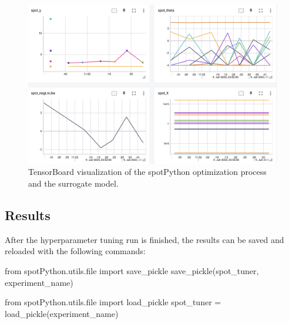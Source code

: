 \documentclass[
  letterpaper,
  DIV=11,
  numbers=noendperiod]{scrreprt}
\newenvironment{Shaded}{\begin{snugshade}}{\end{snugshade}}
\newcommand{\BuiltInTok}[1]{\textcolor[rgb]{0.00,0.23,0.31}{#1}}
\newcommand{\ImportTok}[1]{\textcolor[rgb]{0.00,0.46,0.62}{#1}}
\newcommand{\NormalTok}[1]{\textcolor[rgb]{0.00,0.23,0.31}{#1}}
\newcommand{\OperatorTok}[1]{\textcolor[rgb]{0.37,0.37,0.37}{#1}}
\begin{document}
\begin{figure}

{\centering \includegraphics[width=1\textwidth,height=\textheight]{figures_static/13_tensorboard_01.png}

}

\caption{TensorBoard visualization of the spotPython optimization
process and the surrogate model.}

\end{figure}

\hypertarget{results-5}{%
\subsection{Results}\label{results-5}}

After the hyperparameter tuning run is finished, the results can be
saved and reloaded with the following commands:

\begin{Shaded}
\begin{Highlighting}[]
\ImportTok{from}\NormalTok{ spotPython.utils.}\BuiltInTok{file} \ImportTok{import}\NormalTok{ save\_pickle}
\NormalTok{save\_pickle(spot\_tuner, experiment\_name)}
\end{Highlighting}
\end{Shaded}

\begin{Shaded}
\begin{Highlighting}[]
\ImportTok{from}\NormalTok{ spotPython.utils.}\BuiltInTok{file} \ImportTok{import}\NormalTok{ load\_pickle}
\NormalTok{spot\_tuner }\OperatorTok{=}\NormalTok{ load\_pickle(experiment\_name)}
\end{Highlighting}
\end{Shaded}
\end{document}
